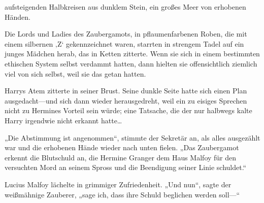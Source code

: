 

 aufsteigenden Halbkreisen aus dunklem Stein, ein großes Meer von erhobenen Händen.

\hplettrineextrapara
Die Lords und Ladies des Zaubergamots, in pflaumenfarbenen Roben, die mit einem silbernen ‚Z‘ gekennzeichnet waren, starrten in strengem Tadel auf ein junges Mädchen herab, das in Ketten zitterte. Wenn sie sich in einem bestimmten ethischen System selbst verdammt hatten, dann hielten sie offensichtlich ziemlich viel von sich selbst, weil sie das getan hatten.

Harrys Atem zitterte in seiner Brust. Seine dunkle Seite hatte sich einen Plan ausgedacht—und sich dann wieder herausgedreht, weil ein zu eisiges Sprechen nicht zu Hermines Vorteil sein würde; eine Tatsache, die der nur halbwegs kalte Harry irgendwie nicht erkannt hatte…

„Die Abstimmung ist angenommen“, stimmte der Sekretär an, als alles ausgezählt war und die erhobenen Hände wieder nach unten fielen. „Das Zaubergamot erkennt die Blutschuld an, die Hermine Granger dem Haus Malfoy für den versuchten Mord an seinem Spross und die Beendigung seiner Linie schuldet.“

Lucius Malfoy lächelte in grimmiger Zufriedenheit.
„Und nun“, sagte der weißmähnige Zauberer, „sage ich, dass ihre Schuld beglichen werden soll—“

